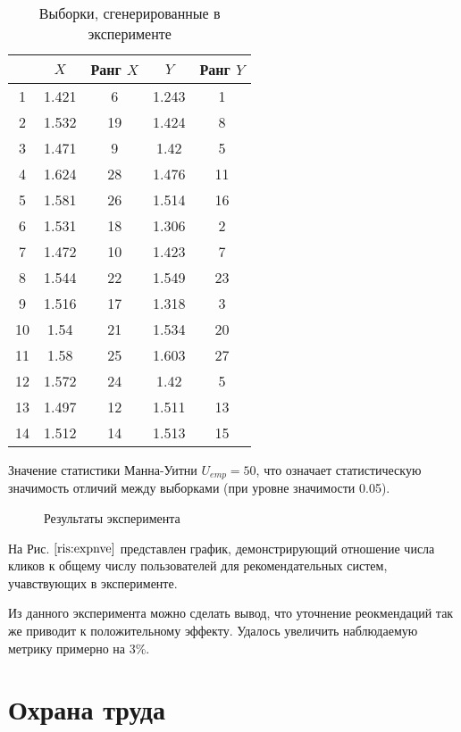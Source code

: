 \documentclass[12pt,a4paper]{report}
\begin{document}
\begin{table} [H]
\label{tabular:normalvsemexp}
\begin{center}
\begin{tabular}{|c|c|c|c|c|}
\hline
 & $X$ & Ранг $X$ & $Y$ & Ранг $Y$   \\
  \hline
 1&1.421&6&1.243&1\\
 \hline
 2&1.532&19&1.424&8\\
 \hline
 3&1.471&9&1.42&5\\
 \hline
 4&1.624&28&1.476&11\\
 \hline
 5&1.581&26&1.514&16\\
 \hline
 6&1.531&18&1.306&2\\
 \hline
 7&1.472&10&1.423&7\\
 \hline
 8&1.544&22&1.549&23\\
 \hline
 9&1.516&17&1.318&3\\
 \hline
 10&1.54&21&1.534&20\\
 \hline
 11&1.58&25&1.603&27\\
 \hline
 12&1.572&24&1.42&5\\
 \hline
 13&1.497&12&1.511&13\\
 \hline
 14&1.512&14&1.513&15\\
 \hline
\end{tabular}
\end{center}
\caption{Выборки, сгенерированные в эксперименте}
\end{table}

Значение статистики Манна-Уитни $U_{emp} = 50$, что означает статистическую значимость отличий между выборками (при уровне значимости 0.05). 

\begin{figure}[H]
\caption{Результаты эксперимента}
\label{ris:expnve}
\end{figure}

На Рис. $\ref{ris:expnve}$ представлен график, демонстрирующий отношение числа кликов к общему числу пользователей для рекомендательных систем, учавствующих в эксперименте.

Из данного эксперимента можно сделать вывод, что уточнение реокмендаций так же приводит к положительному эффекту. Удалось увеличить наблюдаемую метрику примерно на 3\%.

\chapter{Охрана труда}
\end{document}
